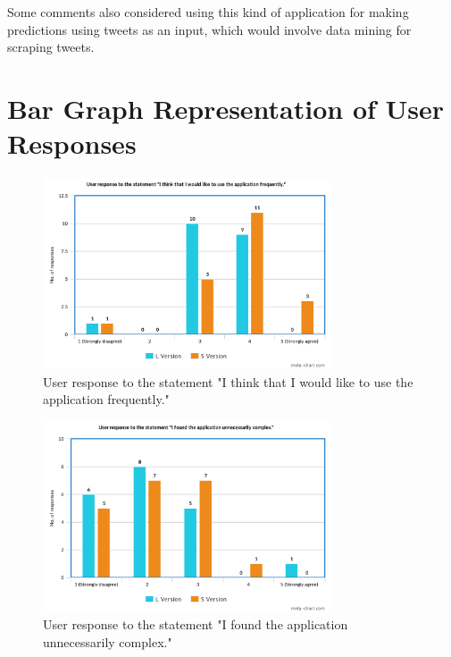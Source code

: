 \documentclass[journal]{./IEEE/IEEEtran}
\begin{document}
Some comments also considered using this kind of application for making predictions using tweets as an input, which would involve data mining for scraping tweets.

\appendices
\section{Bar Graph Representation of User Responses}

\begin{figure}[!ht]
\begin{center}

\includegraphics[width=85mm]{images/s1.png}
\caption{User response to the statement "I think that I would like to use the application frequently."}

\end{center}
\end{figure}

\begin{figure}[!ht]
\begin{center}

\includegraphics[width=85mm]{images/s2.png}
\caption{User response to the statement "I found the application unnecessarily complex."}

\end{center}
\end{figure}
\end{document}
